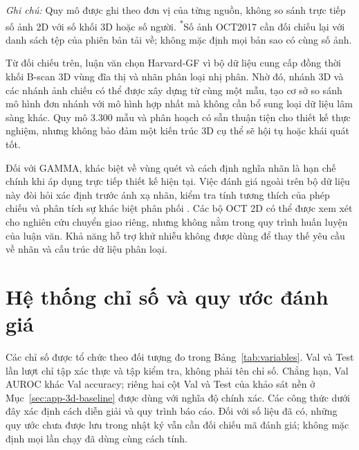 \endgroup
\noindent\textit{Ghi chú:} Quy mô được ghi theo đơn vị của từng nguồn,
không so sánh trực tiếp số ảnh 2D với số khối 3D hoặc số người.
\textsuperscript{*}Số ảnh OCT2017 cần đối chiếu lại với danh sách tệp
của phiên bản tải về; không mặc định mọi bản sao có cùng số ảnh.

Từ đối chiếu trên, luận văn chọn Harvard-GF vì bộ dữ liệu cung cấp
đồng thời khối B-scan 3D vùng đĩa thị và nhãn phân loại nhị phân.
Nhờ đó, nhánh 3D và các nhánh ảnh chiếu có thể được xây dựng từ
cùng một mẫu, tạo cơ sở so sánh mô hình đơn nhánh với mô hình hợp
nhất mà không cần bổ sung loại dữ liệu lâm sàng khác. Quy mô 3.300
mẫu và phân hoạch có sẵn thuận tiện cho thiết kế thực nghiệm,
nhưng không bảo đảm một kiến trúc 3D cụ thể sẽ hội tụ hoặc khái quát tốt.

Đối với GAMMA, khác biệt về vùng quét và cách định nghĩa nhãn là
hạn chế chính khi áp dụng trực tiếp thiết kế hiện tại. Việc đánh
giá ngoài trên bộ dữ liệu này đòi hỏi xác định trước
ánh xạ nhãn, kiểm tra tính tương thích của phép chiếu và phân tích
sự khác biệt phân phối \cite{wu2022gamma}. Các bộ OCT 2D có thể
được xem xét cho nghiên cứu chuyển giao riêng, nhưng không nằm trong
quy trình huấn luyện của luận văn. Khả năng hỗ trợ khử nhiễu không
được dùng để thay thế yêu cầu về nhãn và cấu trúc dữ liệu phân loại.

\section{Hệ thống chỉ số và quy ước đánh giá}
\label{sec:evaluation-metrics}
Các chỉ số được tổ chức theo đối tượng đo trong Bảng~\ref{tab:variables}.
Val và Test lần lượt chỉ tập xác thực và tập kiểm tra, không phải tên chỉ số.
Chẳng hạn, Val AUROC khác Val accuracy; riêng hai cột Val và Test của khảo
sát nền ở Mục~\ref{sec:app-3d-baseline} được dùng với nghĩa độ chính xác.
Các công thức dưới đây xác định cách diễn giải và quy trình báo cáo.
Đối với số liệu đã có, những quy ước chưa được lưu trong nhật ký vẫn cần
đối chiếu mã đánh giá; không mặc định mọi lần chạy đã dùng cùng cách tính.

